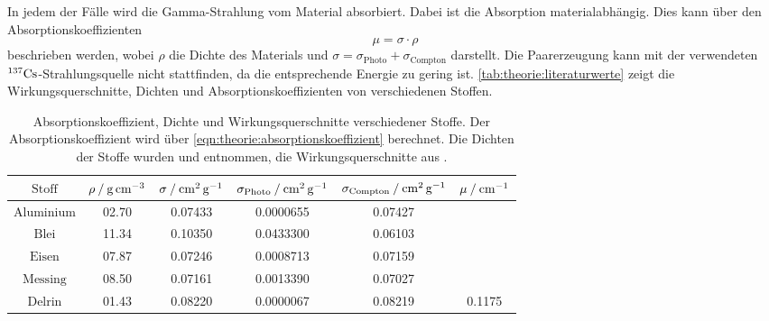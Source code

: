     In jedem der Fälle wird die Gamma-Strahlung vom Material absorbiert.
    Dabei ist die Absorption materialabhängig.
    Dies kann über den Absorptionskoeffizienten
    \begin{equation}
        \mu = \sigma \cdot \rho
        \label{eqn:theorie:absorptionskoeffizient}
    \end{equation}
    beschrieben werden,
    wobei $\rho$ die Dichte des Materials und $\sigma = \sigma_\text{Photo} + \sigma_\text{Compton}$ darstellt.
    Die Paarerzeugung kann mit der verwendeten $^{137}\ce{Cs}$-Strahlungsquelle nicht stattfinden,
    da die entsprechende Energie zu gering ist.
    \autoref{tab:theorie:literaturwerte} zeigt die Wirkungsquerschnitte,
    Dichten und Absorptionskoeffizienten von verschiedenen Stoffen.
    \begin{table}[H]
        \centering
        \caption{Absorptionskoeffizient, Dichte und Wirkungsquerschnitte verschiedener Stoffe.
        Der Absorptionskoeffizient wird über \autoref{eqn:theorie:absorptionskoeffizient} berechnet.
        Die Dichten der Stoffe wurden \cite{dichten} und \cite{TODO} entnommen,
        die Wirkungsquerschnitte aus \cite{crosssections}.}
        \label{tab:theorie:literaturwerte}
        \begin{tabular}{c c c c c c}
            \toprule
            $\text{Stoff}$ &
            $\rho \mathbin{/} \si[per-mode=reciprocal]{\gram\per\cubic\centi\meter}$ &
            $\sigma \mathbin{/} \si[per-mode=reciprocal]{\centi\meter\squared\per\gram}$ &
            $\sigma_\text{Photo} \mathbin{/} \si[per-mode=reciprocal]{\centi\meter\squared\per\gram}$ &
            $\sigma_\text{Compton} \mathbin{/} \si[per-mode=reciprocal]{\centi\meter\squared\per\gram}$ &
            $\mu \mathbin{/} \si[per-mode=reciprocal]{\per\centi\meter}$ \\
            \midrule
            $\text{Aluminium}$ & 02.70 & 0.07433 & 0.0000655 & 0.07427 &   \\
            $\text{Blei}$      & 11.34 & 0.10350 & 0.0433300 & 0.06103 &   \\
            $\text{Eisen}$     & 07.87 & 0.07246 & 0.0008713 & 0.07159 &   \\
            $\text{Messing}$   & 08.50 & 0.07161 & 0.0013390 & 0.07027 &   \\
            $\text{Delrin}$    & 01.43 & 0.08220 & 0.0000067 & 0.08219 & 0.1175  \\
            \bottomrule
        \end{tabular}
    \end{table}
